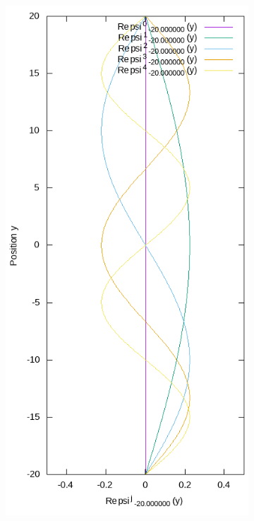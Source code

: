 \documentclass[11pt, a4paper]{article} %
\begin{document}
\begin{figure}[h!]
\begin{subfigure}[b]{0.15\linewidth}
    \includegraphics[width=\linewidth]{Eig1.png}
  \end{subfigure}
    \begin{subfigure}[b]{0.15\linewidth}

\end{subfigure}
\end{figure}
\end{document}

